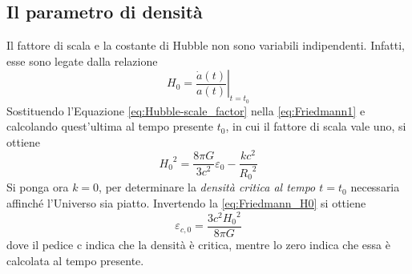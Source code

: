 \subsection{Il parametro di densità}
Il fattore di scala e la costante di Hubble non sono variabili indipendenti. Infatti, esse sono legate dalla relazione
\begin{equation}
    H_0 = \left. \frac{\dot{a}(t)}{a(t)}\right|_{t=t_0}
    \label{eq:Hubble-scale_factor}
\end{equation}
Sostituendo l'Equazione \ref{eq:Hubble-scale_factor} nella \ref{eq:Friedmann1} e calcolando quest'ultima al tempo presente $t_0$, in cui il fattore di scala vale uno, si ottiene
\begin{equation}
    {H_0}^2=\frac{8\pi G}{3c^2}\varepsilon_0-\frac{kc^2}{{R_0}^2}
    \label{eq:Friedmann_H0}
\end{equation}
Si ponga ora $k=0$, per determinare la \emph{densità critica al tempo $t=t_0$} necessaria affinché l'Universo sia piatto. Invertendo la \ref{eq:Friedmann_H0} si ottiene
\begin{equation}
    \varepsilon_{c,0}=\frac{3c^2{H_0}^2}{8\pi G}
    \label{eq:critical_density0}
\end{equation}
dove il pedice c indica che la densità è critica, mentre lo zero indica che essa è calcolata al tempo presente.

